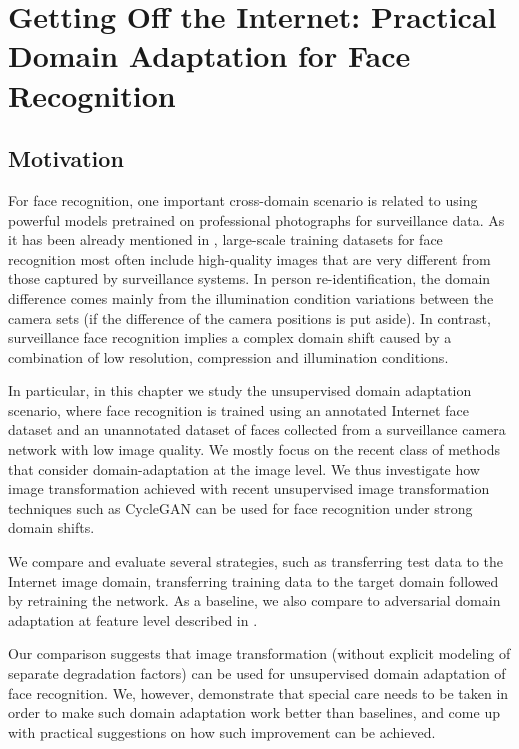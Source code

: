 

\chapter{Getting Off the Internet: Practical Domain Adaptation for Face Recognition}
\label{chapt:wildface}


\section{Motivation}
For face recognition, one important cross-domain scenario is related to using powerful models pretrained on professional photographs for surveillance data. As it has been already mentioned in , large-scale training datasets for face recognition most often include high-quality images that are very different from those captured by surveillance systems. In person re-identification, the domain difference comes mainly from the illumination condition variations between the camera sets (if the difference of the camera positions is put aside). In contrast,  surveillance face recognition implies a complex domain shift caused by a combination of low resolution, compression and illumination conditions. 


In particular, in this chapter we study the unsupervised domain adaptation scenario, where face recognition is trained using an annotated Internet face dataset and an unannotated dataset of faces collected from a surveillance camera network with low image quality. We mostly focus on the recent class of methods that consider domain-adaptation at the image level. We thus investigate how image transformation achieved with recent unsupervised image transformation techniques such as CycleGAN \citep{ZhuPIE17} can be used for face recognition under strong domain shifts. 

We compare and evaluate several strategies, such as transferring test data to the Internet image domain,  transferring training data to the target domain followed by retraining the network. As a baseline, we also compare to adversarial domain adaptation at feature level described in .%

Our comparison suggests that image transformation (without explicit modeling of separate degradation factors) can be used for unsupervised domain adaptation of face recognition. We, however, demonstrate that special care needs to be taken in order to make such domain adaptation work better than baselines, and come up with practical suggestions on how such improvement can be achieved.

